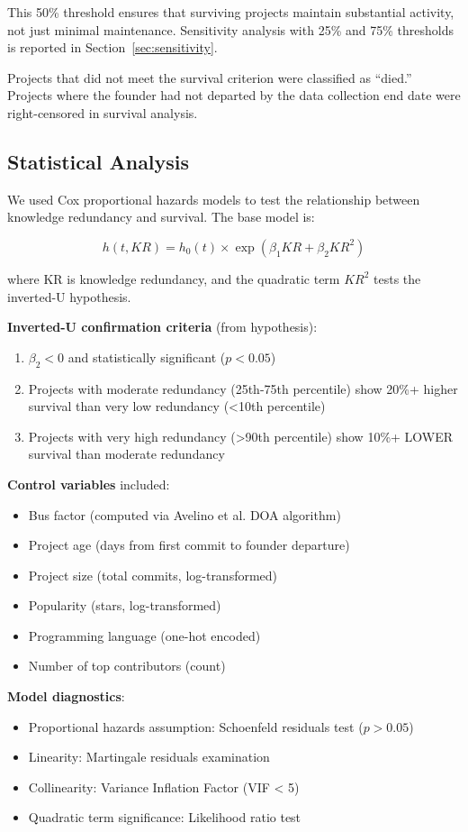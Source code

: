 \documentclass[11pt,letterpaper]{article}
\begin{document}
This 50\% threshold ensures that surviving projects maintain substantial activity, not just minimal maintenance. Sensitivity analysis with 25\% and 75\% thresholds is reported in Section~\ref{sec:sensitivity}.

Projects that did not meet the survival criterion were classified as ``died.'' Projects where the founder had not departed by the data collection end date were right-censored in survival analysis.

\subsection{Statistical Analysis}

We used Cox proportional hazards models to test the relationship between knowledge redundancy and survival. The base model is:

\[h(t, KR) = h_0(t) \times \exp(\beta_1 KR + \beta_2 KR^2)\]

where KR is knowledge redundancy, and the quadratic term $KR^2$ tests the inverted-U hypothesis.

\textbf{Inverted-U confirmation criteria} (from hypothesis):
\begin{enumerate}
    \item $\beta_2 < 0$ and statistically significant ($p < 0.05$)
    \item Projects with moderate redundancy (25th-75th percentile) show 20\%+ higher survival than very low redundancy (<10th percentile)
    \item Projects with very high redundancy (>90th percentile) show 10\%+ LOWER survival than moderate redundancy
\end{enumerate}

\textbf{Control variables} included:
\begin{itemize}
    \item Bus factor (computed via Avelino et al. \cite{Avelino2016} DOA algorithm)
    \item Project age (days from first commit to founder departure)
    \item Project size (total commits, log-transformed)
    \item Popularity (stars, log-transformed)
    \item Programming language (one-hot encoded)
    \item Number of top contributors (count)
\end{itemize}

\textbf{Model diagnostics}:
\begin{itemize}
    \item Proportional hazards assumption: Schoenfeld residuals test ($p > 0.05$)
    \item Linearity: Martingale residuals examination
    \item Collinearity: Variance Inflation Factor (VIF < 5)
    \item Quadratic term significance: Likelihood ratio test
\end{itemize}
\end{document}
